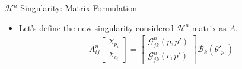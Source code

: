 \documentclass[8pt]{beamer}
\begin{document}
\begin{frame}{\color{white} $\mathcal{H}^n$ Singularity: Matrix Formulation}
\begin{itemize}
\begin{align}
    \begin{bmatrix}
    2\delta_{ji} + \mathcal{H}_{ji}^{n}(p,p') & \mathcal{H}_{ji}^{n}(p,c') \\
    \mathcal{H}_{ji}^{n}(c,p') & 2\delta_{ji} + \mathcal{H}_{ji}^{n}(c,c')
    \end{bmatrix}
    \begin{bmatrix}
    \chi_{p_i} \\
    \chi_{c_i}
    \end{bmatrix}
    =
    \begin{bmatrix}
    \mathcal{G}_{jk}^{n}(p,p') \\
    \mathcal{G}_{jk}^{n}(c,p')
    \end{Gmatrix}
    \mathcal{B}_{k}(\theta'_{p'})
    \end{align}
    \item Let's define the new singularity-considered $\mathcal{H}^n$ matrix as \textbf{$A$}.
    \begin{align}
    A^n_{ij}
    \begin{bmatrix}
    \chi_{p_i} \\
    \chi_{c_i}
    \end{bmatrix}
    =
    \begin{bmatrix}
    \mathcal{G}_{jk}^{n}(p,p') \\
    \mathcal{G}_{jk}^{n}(c,p')
    \end{bmatrix}
    \mathcal{B}_{k}(\theta'_{p'})
    \label{eq:non_discretized_A_ij}
    \end{align}
\end{itemize}
\end{frame}
\end{document}
